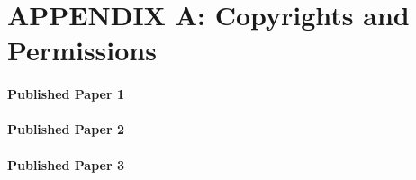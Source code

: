 \chapter*{APPENDIX A: Copyrights and Permissions} \label{App:AppendixA}


\subsubsection*{Published Paper 1}


\subsubsection*{Published Paper 2}


\subsubsection*{Published Paper 3}

